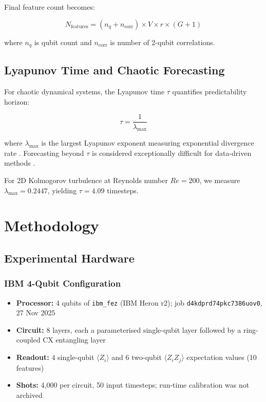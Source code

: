 \documentclass[conference]{IEEEtran}
\begin{document}
Final feature count becomes:

\begin{equation}
N_{\text{features}} = (n_q + n_{\text{corr}}) \times V \times r \times (G+1)
\label{eq:feature_formula}
\end{equation}

where $n_q$ is qubit count and $n_{\text{corr}}$ is number of 2-qubit correlations.

\subsection{Lyapunov Time and Chaotic Forecasting}

For chaotic dynamical systems, the Lyapunov time $\tau$ quantifies predictability horizon:

\begin{equation}
\tau = \frac{1}{\lambda_{\max}}
\label{eq:lyapunov_time}
\end{equation}

where $\lambda_{\max}$ is the largest Lyapunov exponent measuring exponential divergence rate \cite{strogatz2018nonlinear}. Forecasting beyond $\tau$ is considered exceptionally difficult for data-driven methods \cite{pathak2018model}.

For 2D Kolmogorov turbulence at Reynolds number $Re=200$, we measure $\lambda_{\max} = 0.2447$, yielding $\tau = 4.09$ timesteps.

\FloatBarrier
\section{Methodology}
\label{sec:methodology}

\subsection{Experimental Hardware}

\subsubsection{IBM 4-Qubit Configuration}

\begin{itemize}
    \item \textbf{Processor:} 4 qubits of \texttt{ibm\_fez} (IBM Heron r2); job \texttt{d4kdprd74pkc7386uov0}, 27 Nov 2025
    \item \textbf{Circuit:} 8 layers, each a parameterised single-qubit layer followed by a ring-coupled CX entangling layer
    \item \textbf{Readout:} 4 single-qubit $\langle Z_i \rangle$ and 6 two-qubit $\langle Z_i Z_j \rangle$ expectation values (10 features)
    \item \textbf{Shots:} 4{,}000 per circuit, 50 input timesteps; run-time calibration was not archived
\end{itemize}
\end{document}

